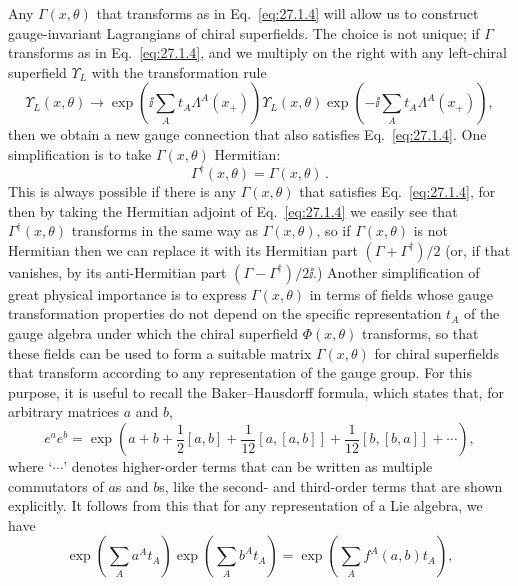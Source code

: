 Any \(\Gamma(x,\theta)\) that transforms as in Eq.~\eqref{eq:27.1.4} will
allow us to construct gauge-invariant Lagrangians of chiral superfields.
The choice is not unique; if \(\Gamma\) transforms as in
Eq.~\eqref{eq:27.1.4}, and we multiply on the right with any left-chiral
superfield \(\Upsilon_L\) with the transformation rule
\[
  \Upsilon_L(x,\theta)\longrightarrow
  \exp\left(\ii\sum_A t_A\Lambda^A(x_+)\right)
  \Upsilon_L(x,\theta)
  \exp\left(-\ii\sum_A t_A\Lambda^A(x_+)\right),
\]
then we obtain a new gauge connection that also satisfies
Eq.~\eqref{eq:27.1.4}. One simplification is to take
\(\Gamma(x,\theta)\) Hermitian:
\begin{equation}
  \Gamma^\dagger(x,\theta)=\Gamma(x,\theta)\,.
  \tag{27.1.6}\label{eq:27.1.6}
\end{equation}
This is always possible if there is any \(\Gamma(x,\theta)\) that satisfies
Eq.~\eqref{eq:27.1.4}, for then by taking the Hermitian adjoint of
Eq.~\eqref{eq:27.1.4} we easily see that \(\Gamma^\dagger(x,\theta)\)
transforms in the same way as \(\Gamma(x,\theta)\), so if
\(\Gamma(x,\theta)\) is not Hermitian then we can replace it with its
Hermitian part \((\Gamma+\Gamma^\dagger)/2\) (or, if that vanishes, by its
anti-Hermitian part \((\Gamma-\Gamma^\dagger)/2\ii\).) Another simplification
of great physical importance is to express \(\Gamma(x,\theta)\) in terms
of fields whose gauge transformation properties do not depend on the
specific representation \(t_A\) of the gauge algebra under which the
chiral superfield \(\Phi(x,\theta)\) transforms, so that these fields can
be used to form a suitable matrix \(\Gamma(x,\theta)\) for chiral
superfields that transform according to any representation of the gauge
group. For this purpose, it is useful to recall the Baker--Hausdorff
formula, which states that, for arbitrary matrices \(a\) and \(b\),
\begin{equation}
  e^a e^b
  =\exp\left(
    a+b+\frac12[a,b]
    +\frac1{12}[a,[a,b]]
    +\frac1{12}[b,[b,a]]
    +\cdots
  \right),
  \tag{27.1.7}\label{eq:27.1.7}
\end{equation}
where `\(\cdots\)' denotes higher-order terms that can be written as
multiple commutators of \(a\)s and \(b\)s, like the second- and third-order
terms that are shown explicitly. It follows from this that for any
representation of a Lie algebra, we have
\begin{equation}
  \exp\left(\sum_A a^A t_A\right)
  \exp\left(\sum_A b^A t_A\right)
  =\exp\left(\sum_A f^A(a,b)t_A\right),
  \tag{27.1.8}\label{eq:27.1.8}
\end{equation}

